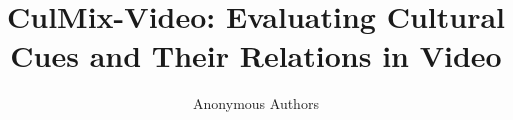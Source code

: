\documentclass[11pt]{article}
\title{CulMix-Video: Evaluating Cultural Cues and Their Relations in Video}
\author{Anonymous Authors}
\begin{document}
\maketitle

\begin{abstract}

\end{abstract}













\appendix

\end{document}
